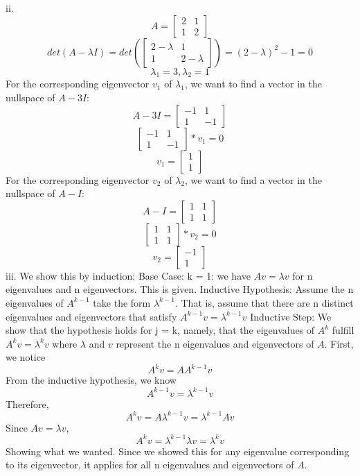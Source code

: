 \documentclass[11pt]{article}
\begin{document}
\begin{enumerate}
{ii. \[A = \begin{bmatrix}
    2 & 1  \\
    1 & 2 
  \end{bmatrix} \]
  \[det(A - \lambda I) = det( \begin{bmatrix} 2 - \lambda & 1 \\ 1 & 2 - \lambda \end{bmatrix}) = (2-\lambda )^{2} -1 = 0
 \]
 \[ \lambda_1 = 3 , \lambda_2 = 1 \]
 For the corresponding eigenvector $v_1$ of $\lambda_1 $, we want to find a vector in the nullspace of $ A - 3I $:
 \[ A - 3I = \begin{bmatrix} -1 & 1 \\ 1 & -1 \end{bmatrix} \]
 \[\begin{bmatrix} -1 & 1 \\ 1 & -1 \end{bmatrix} * v_1 = 0 \]
 \[v_1 = \begin{bmatrix} 1 \\ 1 \end{bmatrix} \]
 For the corresponding eigenvector $v_2$ of $\lambda_2 $, we want to find a vector in the nullspace of $ A - I $: 
 \[ A - I = \begin{bmatrix} 1 & 1 \\ 1 & 1 \end{bmatrix} \]
 \[ \begin{bmatrix} 1 & 1 \\ 1 & 1 \end{bmatrix} * v_2 = 0 \] \[v_2 = \begin{bmatrix} -1 \\ 1 \end{bmatrix} \]
 iii. We show this by induction: \newline
 Base Case: k = 1: we have $ Av = \lambda v $ for n eigenvalues and n eigenvectors. This is given. \newline
 Inductive Hypothesis: Assume the n eigenvalues of $ A^{k-1} $ take the form $ \lambda^{k-1} $. That is, assume that there are n distinct eigenvalues and eigenvectors that satisfy $ A^{k-1}v  = \lambda^{k-1}v $ \newline Inductive Step: We show that the hypothesis holds for j = k, namely, that the eigenvalues of $A^k$ fulfill $A^{k}v = \lambda^{k}v $ where $\lambda$ and $v$ represent the n eigenvalues and eigenvectors of $A$. First, we notice
 \[ A^{k}v = AA^{k-1}v\]
 From the inductive hypothesis, we know \[A^{k-1}v = \lambda^{k-1}v \]
 Therefore,
 \[ A^{k}v = A\lambda^{k-1}v = \lambda^{k-1}Av \]
 Since $ Av = \lambda v $, 
 \[A^{k} v = \lambda^{k-1}\lambda v = \lambda^{k} v \]
 Showing what we wanted. Since we showed this for any eigenvalue corresponding to its eigenvector, it applies for all n eigenvalues and eigenvectors of $ A $. 
}


\end{enumerate}
\end{document}
